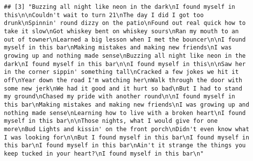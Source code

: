 \documentclass[]{article}
\begin{document}
\begin{verbatim}
## [3] "Buzzing all night like neon in the dark\nI found myself in this\n\nCouldn't wait to turn 21\nThe day I did I got too drunk\nSpinnin' round dizzy on the patio\nFound out real quick how to take it slow\nGot whiskey bent on whiskey sours\nRan my mouth to an out of towner\nLearned a big lesson when I met the bouncer\n\nI found myself in this bar\nMaking mistakes and making new friends\nI was growing up and nothing made sense\nBuzzing all night like neon in the dark\nI found myself in this bar\n\nI found myself in this\n\nSaw her in the corner sippin' something tall\nCracked a few jokes we hit it off\nYear down the road I'm watching her\nWalk through the door with some new jerk\nWe had it good and it hurt so bad\nBut I had to stand my ground\nChased my pride with another round\n\nI found myself in this bar\nMaking mistakes and making new friends\nI was growing up and nothing made sense\nLearning how to live with a broken heart\nI found myself in this bar\n\nThose nights, what I would give for one more\nBud Lights and kissin' on the front porch\nDidn't even know what I was looking for\n\nBut I found myself in this bar\nI found myself in this bar\nI found myself in this bar\nAin't it strange the things you keep tucked in your heart?\nI found myself in this bar\n"                                                                                                                                                                                                                                                                                                                                                                                                                                  

\end{verbatim}
\end{document}
